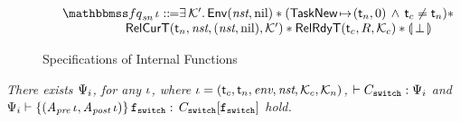 \begin{figure}[!thp]
\[\begin{array}{l}
            \\[-9pt]
            \quad
            \relspecpost_{\textit{sn}} \, \lgvl \define 
            \exists \, \hthrdlocalst'. \, 
            \Env{\nst, \nil} \sepstar 
            (\msto{\TaskNew}{(\thrdid_n, 0)} \, \land \, \thrdid_c \neq \thrdid_n) \sepstar \\
            \hspace*{6em}
            \RelCurT{\thrdid_n}{\nst}{(\nst, \nil)}{\hthrdlocalst'} 
            \sepstar \RelRdyT{\thrdid_c}{\RFile}{\hthrdlocalst_c}
            \sepstar \safePrimAst{\, \primdone \,}
        \end{array}
    \]
    \caption{Specifications of Internal Functions}
    \label{fig:Specifications of Internal Functions}
\end{figure}

\begin{lemma}
    \em
    \label{lemma:codeproof}
    There exists $\Psi_i$, for any $\iota$,
    where $\iota = (\textsf{t}_c, \textsf{t}_n, \textit{env}, \textit{nst}, \mathcal{K}_c, 
    \mathcal{K}_n)$,
    $\vdash {C_{\texttt{switch}}} : {\Psi_i}$ and 
    ${\Psi_i} \vdash \{ ({\textit{A}_\textit{pre} \, \iota}, {\textit{A}_\textit{post} \, \iota}) \} \, {\texttt{f}_{\texttt{switch}}} : \, {C_{\texttt{switch}}[\texttt{f}_{\texttt{switch}}]}$ hold. 
\end{lemma}

